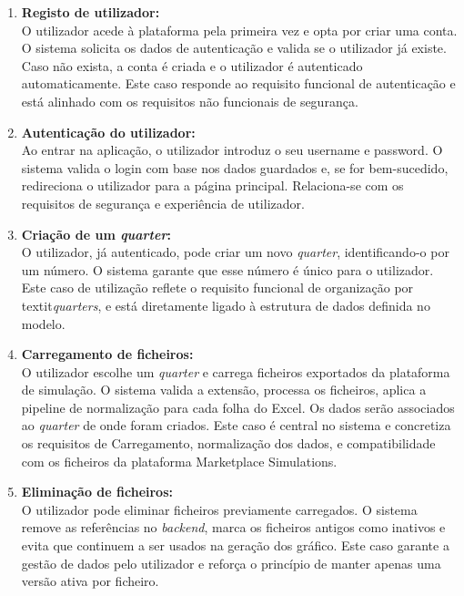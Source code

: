 \begin{enumerate}
    \item \textbf{Registo de utilizador: } \\
    O utilizador acede à plataforma pela primeira vez e opta por criar uma conta. O sistema solicita os dados de autenticação e valida se o utilizador já existe. Caso não exista, a conta é criada e o utilizador é autenticado automaticamente. Este caso responde ao requisito funcional de autenticação e está alinhado com os requisitos não funcionais de segurança.
    
    \item \textbf{Autenticação do utilizador: } \\
    Ao entrar na aplicação, o utilizador introduz o seu username e password. O sistema valida o login com base nos dados guardados e, se for bem-sucedido, redireciona o utilizador para a página principal. Relaciona-se com os requisitos de segurança e experiência de utilizador.
    
    \item \textbf{Criação de um \textit{quarter}: } \\
    O utilizador, já autenticado, pode criar um novo \textit{quarter}, identificando-o por um número. O sistema garante que esse número é único para o utilizador. Este caso de utilização reflete o requisito funcional de organização por textit{\textit{quarters}}, e está diretamente ligado à estrutura de dados definida no modelo.
    
    \item \textbf{Carregamento de ficheiros: } \\
    O utilizador escolhe um \textit{quarter} e carrega ficheiros exportados da plataforma de simulação. O sistema valida a extensão, processa os ficheiros, aplica a pipeline de normalização para cada folha do Excel. Os dados serão associados ao \textit{quarter} de onde foram criados. Este caso é central no sistema e concretiza os requisitos de Carregamento, normalização dos dados, e compatibilidade com os ficheiros da plataforma Marketplace Simulations.

    \item \textbf{Eliminação de ficheiros: } \\
    O utilizador pode eliminar ficheiros previamente carregados. O sistema remove as referências no \textit{backend}, marca os ficheiros antigos como inativos e evita que continuem a ser usados na geração dos gráfico. Este caso garante a gestão de dados pelo utilizador e reforça o princípio de manter apenas uma versão ativa por ficheiro.
    

\end{enumerate}
